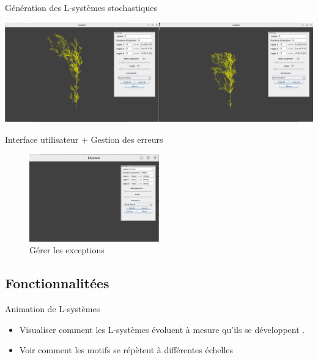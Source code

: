     \begin{frame}{Génération des L-systèmes stochastiques}
        \begin{center}
        \includegraphics[scale=0.15]{./images/capture1.png}
        
    \end{center}
    \end{frame}
    
  

\begin{frame}{Interface utilisateur + Gestion des erreurs }
    \begin{figure}[h!]
      \centering
      \includegraphics[width=0.5\textwidth]{images/tryandcatch.png}
      \caption{Gérer les exceptions}
      \label{fig:3D}
    \end{figure}
    \end{frame}


\subsection{Fonctionnalitées}
 \begin{frame}{Animation de L-systèmes}
 
        \begin{itemize}
            \item  Visualiser comment les L-systèmes évoluent à mesure qu'ils se développent .

            \item Voir comment les motifs se répètent à différentes échelles

        \end{itemize}
        
\end{frame}
    

